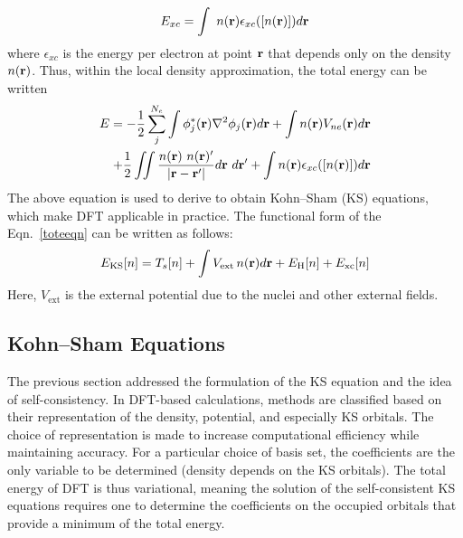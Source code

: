 \begin{equation}\label{ldaeqn}
E_{xc} = \int \ n(\vb{r})\epsilon_{xc}([n(\vb{r})]) d\vb{r}
\end{equation}
where $\epsilon_{xc}$ is the energy per electron at point $\vb{r}$ that depends only on the density $n(\vb{r})$. Thus, within the local density approximation, the total energy can be written 
\begin{align}\label{toteeqn}
\begin{split}
E=-\frac{1}{2}\sum_j^{N_e} \int \phi^{\ast}_j (\vb{r})\nabla^2 \phi_j(\vb{r}) d\vb{r}  + \int n(\vb{r})V_{ne}(\vb{r})d\vb{r}  \\
+ \frac{1}{2}\iint \frac{n(\vb{r})\ n(\vb{r})'}{\abs{\vb{r}-\vb{r}'}} d\vb{r}\ d\vb{r}'  + \int n(\vb{r})\epsilon_{xc}([n(\vb{r})]) d\vb{r} 
\end{split}
\end{align}
The above equation is used to derive to obtain Kohn--Sham (KS) equations, which make DFT applicable in practice. The functional form of the Eqn.~\eqref{toteeqn} can be written as follows:
\begin{equation}\label{eqks}
E_{\text{KS}}[n] = T_s[n] + \int V_{\text{ext}}\,n(\vb{r}) d\vb{r} + E_{\text{H}}[n] + E_{\text{xc}}[n]
\end{equation}
Here, $V_{\text{ext}}$ is the external potential due to the nuclei and other external fields.


\subsection{Kohn--Sham Equations}
The previous section addressed the formulation of the KS equation and the idea of self-consistency. In DFT-based calculations, methods are classified based on their representation of the density, potential, and especially KS orbitals. The choice of representation is made to increase computational efficiency while maintaining accuracy.
For a particular choice of basis set, the coefficients are the only variable to be determined (density depends on the KS orbitals). The total energy of DFT is thus variational, meaning the solution of the self-consistent KS equations requires one to determine the coefficients on the occupied orbitals that provide a minimum of the total energy.

